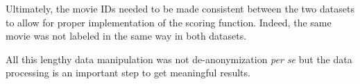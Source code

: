 Ultimately, the movie IDs needed to be made consistent between the two datasets to allow for proper implementation of the scoring function. Indeed, the same movie was not labeled in the same way in both datasets.

All this lengthy data manipulation was not de-anonymization \textit{per se} but the data processing is an important step to get meaningful results.